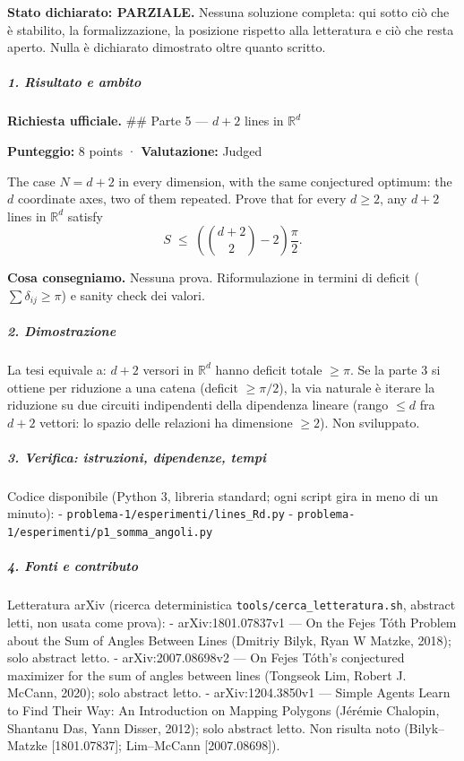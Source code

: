 \documentclass[11pt,a4paper]{article}
\begin{document}
\textbf{Stato dichiarato: PARZIALE.} Nessuna soluzione completa: qui
sotto ciò che è stabilito, la formalizzazione, la posizione rispetto
alla letteratura e ciò che resta aperto. Nulla è dichiarato dimostrato
oltre quanto scritto.

\subparagraph{1. Risultato e ambito}\label{risultato-e-ambito}

\textbf{Richiesta ufficiale.} \#\# Parte 5 --- \(d+2\) lines in
\(\mathbb{R}^d\)

\textbf{Punteggio:} 8 points · \textbf{Valutazione:} Judged

The case \(N = d+2\) in every dimension, with the same conjectured
optimum: the \(d\) coordinate axes, two of them repeated. Prove that for
every \(d \ge 2\), any \(d+2\) lines in \(\mathbb{R}^d\) satisfy \[
S \;\le\; \left( \binom{d+2}{2} - 2 \right) \frac{\pi}{2}.
\]

\textbf{Cosa consegniamo.} Nessuna prova. Riformulazione in termini di
deficit (\(\sum\delta_{ij}\ge\pi\)) e sanity check dei valori.

\subparagraph{2. Dimostrazione}\label{dimostrazione}

La tesi equivale a: \(d+2\) versori in \(\mathbb R^d\) hanno deficit
totale \(\ge\pi\). Se la parte 3 si ottiene per riduzione a una catena
(deficit \(\ge\pi/2\)), la via naturale è iterare la riduzione su due
circuiti indipendenti della dipendenza lineare (rango \(\le d\) fra
\(d+2\) vettori: lo spazio delle relazioni ha dimensione \(\ge2\)). Non
sviluppato.

\subparagraph{3. Verifica: istruzioni, dipendenze,
tempi}\label{verifica-istruzioni-dipendenze-tempi}

Codice disponibile (Python 3, libreria standard; ogni script gira in
meno di un minuto): - \texttt{problema-1/esperimenti/lines\_Rd.py} -
\texttt{problema-1/esperimenti/p1\_somma\_angoli.py}

\subparagraph{4. Fonti e contributo}\label{fonti-e-contributo}

Letteratura arXiv (ricerca deterministica
\texttt{tools/cerca\_letteratura.sh}, abstract letti, non usata come
prova): - arXiv:1801.07837v1 --- On the Fejes Tóth Problem about the Sum
of Angles Between Lines (Dmitriy Bilyk, Ryan W Matzke, 2018); solo
abstract letto. - arXiv:2007.08698v2 --- On Fejes Tóth's conjectured
maximizer for the sum of angles between lines (Tongseok Lim, Robert J.
McCann, 2020); solo abstract letto. - arXiv:1204.3850v1 --- Simple
Agents Learn to Find Their Way: An Introduction on Mapping Polygons
(Jérémie Chalopin, Shantanu Das, Yann Disser, 2012); solo abstract
letto. Non risulta noto (Bilyk--Matzke {[}1801.07837{]}; Lim--McCann
{[}2007.08698{]}).
\end{document}
